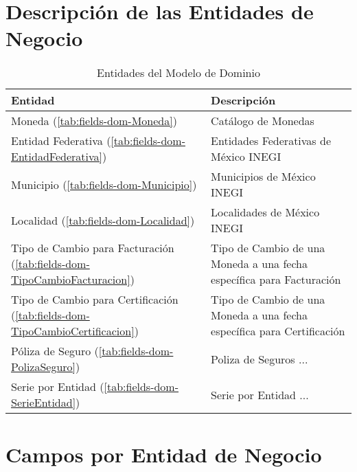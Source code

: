 \clearpage
\section{Descripción de las Entidades de Negocio} \label{sec:dom-banorte.siab}

\begin{table}[H]
	\caption{Entidades del Modelo de Dominio}
	\label{tab:entities}
	\begin{center}
	\begin{tabular}{ l l }
		\hline
		\textbf{Entidad} & \textbf{Descripción} \\
		\hline
		Moneda (\ref{tab:fields-dom-Moneda}) & Catálogo de Monedas \\
		Entidad Federativa (\ref{tab:fields-dom-EntidadFederativa}) & Entidades Federativas de México INEGI \\
		Municipio (\ref{tab:fields-dom-Municipio}) & Municipios de México INEGI \\
		Localidad (\ref{tab:fields-dom-Localidad}) & Localidades de México INEGI \\
		Tipo de Cambio para Facturación (\ref{tab:fields-dom-TipoCambioFacturacion}) & Tipo de Cambio de una Moneda a una fecha específica para Facturación \\
		Tipo de Cambio para Certificación (\ref{tab:fields-dom-TipoCambioCertificacion}) & Tipo de Cambio de una Moneda a una fecha específica para Certificación \\
		Póliza de Seguro (\ref{tab:fields-dom-PolizaSeguro}) & Poliza de Seguros ... \\
		Serie por Entidad (\ref{tab:fields-dom-SerieEntidad}) & Serie por Entidad ... \\
		\hline
	\end{tabular}
	\end{center}
\end{table}

\section{Campos por Entidad de Negocio} \label{sec:entity-fields}

